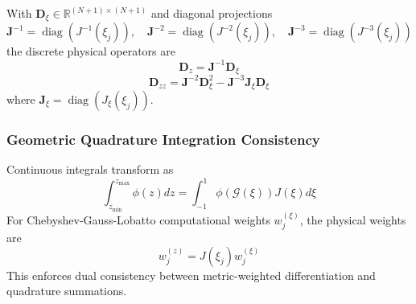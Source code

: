 With $\mathbf{D}_{\xi} \in \mathbb{R}^{(N+1)\times(N+1)}$ and diagonal projections
\begin{equation}
    \mathbf{J}^{-1} = \operatorname{diag}\left(J^{-1}(\xi_j)\right), \quad
    \mathbf{J}^{-2} = \operatorname{diag}\left(J^{-2}(\xi_j)\right), \quad
    \mathbf{J}^{-3} = \operatorname{diag}\left(J^{-3}(\xi_j)\right)
\end{equation}
the discrete physical operators are
\begin{equation}
    \mathbf{D}_z = \mathbf{J}^{-1} \mathbf{D}_{\xi}
\end{equation}
\begin{equation}
    \mathbf{D}_{zz} = \mathbf{J}^{-2} \mathbf{D}_{\xi}^2 - \mathbf{J}^{-3} \mathbf{J}_{\xi} \mathbf{D}_{\xi}
\end{equation}
where $\mathbf{J}_{\xi} = \operatorname{diag}\left(J_{\xi}(\xi_j)\right)$.

\subsubsection{Geometric Quadrature Integration Consistency}
Continuous integrals transform as
\begin{equation}
    \int_{z_{\min}}^{z_{\max}} \phi(z) dz = \int_{-1}^{1} \phi\left(\mathcal{G}(\xi)\right) J(\xi) d\xi
\end{equation}
For Chebyshev-Gauss-Lobatto computational weights $w_j^{(\xi)}$, the physical weights are
\begin{equation}
    w_j^{(z)} = J(\xi_j) w_j^{(\xi)}
\end{equation}
This enforces dual consistency between metric-weighted differentiation and quadrature summations.
